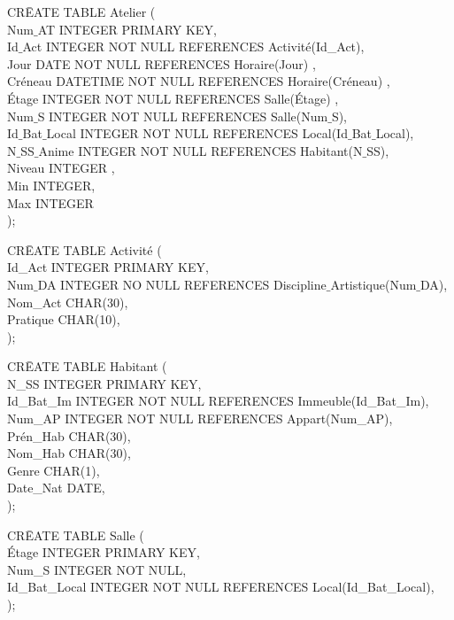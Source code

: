 \documentclass[a4paper,10.5pt]{report}
\begin{document}
		\begin{tabbing}
			CR\=EATE TABLE Atelier (\\
			\> Num$\_$AT INTEGER PRIMARY KEY,\\
			\> Id$\_$Act INTEGER NOT NULL REFERENCES Activité(Id\_Act),\\
            \> Jour DATE NOT NULL REFERENCES Horaire(Jour) ,\\
            \> Créneau DATETIME NOT NULL REFERENCES Horaire(Créneau) ,\\
            \> Étage INTEGER NOT NULL REFERENCES Salle(Étage) ,\\
			\> Num$\_$S INTEGER NOT NULL REFERENCES Salle(Num$\_$S),\\
			\> Id$\_$Bat$\_$Local INTEGER NOT NULL REFERENCES Local(Id$\_$Bat$\_$Local),\\
			\> N$\_$SS$\_$Anime  INTEGER NOT NULL REFERENCES Habitant(N$\_$SS),\\
			\> Niveau INTEGER ,\\
			\> Min INTEGER,\\
			\> Max INTEGER\\);
		\end{tabbing}

		\begin{tabbing}
			CR\=EATE TABLE Activité (\\
			\> Id\_Act INTEGER PRIMARY KEY,\\
			\> Num$\_$DA INTEGER NO NULL REFERENCES Discipline$\_$Artistique(Num$\_$DA),\\
			\> Nom\_Act CHAR(30),\\
			\> Pratique CHAR(10),\\);
		\end{tabbing}

		\begin{tabbing}
			CR\=EATE TABLE Habitant (\\
			\> N\_SS INTEGER PRIMARY KEY,\\
			\> Id\_Bat\_Im INTEGER NOT NULL REFERENCES Immeuble(Id\_Bat\_Im),\\
			\> Num\_AP INTEGER NOT NULL REFERENCES Appart(Num\_AP),\\
			\> Prén\_Hab CHAR(30),\\
			\> Nom\_Hab CHAR(30),\\
			\> Genre CHAR(1),\\
			\> Date\_Nat DATE,\\);
		\end{tabbing}

		\begin{tabbing}
			CR\=EATE TABLE Salle (\\
			\> Étage INTEGER PRIMARY KEY,\\
			\> Num\_S INTEGER NOT NULL,\\
			\> Id\_Bat\_Local INTEGER NOT NULL REFERENCES Local(Id\_Bat\_Local),\\);
		\end{tabbing}
\end{document}
